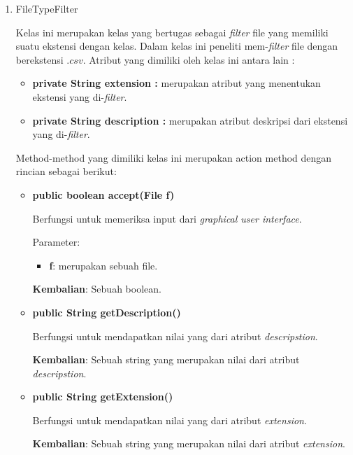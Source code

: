 \begin{enumerate}
	\item FileTypeFilter
	
	Kelas ini merupakan kelas yang bertugas sebagai \textit{filter} file yang memiliki suatu ekstensi dengan kelas. Dalam kelas ini peneliti mem-\textit{filter} file dengan berekstensi \(.csv\). Atribut yang dimiliki oleh kelas ini antara lain :
	
	\begin{itemize}
			\item \textbf{private String extension :} merupakan atribut yang menentukan ekstensi yang di-\textit{filter}.
			\item \textbf{private String description :} merupakan atribut deskripsi dari ekstensi yang di-\textit{filter}.
		\end{itemize}
		
		Method-method yang dimiliki kelas ini merupakan action method dengan rincian sebagai berikut:
		
		\begin{itemize}
		\item \textbf{public boolean accept(File f)} 
		
		Berfungsi untuk memeriksa input dari \textit{graphical user interface}.
		
		Parameter:
	\begin{itemize}
		\item \textbf{f}: merupakan sebuah file. 
	\end{itemize}
	
		\textbf{Kembalian}: Sebuah boolean.
		
		\item \textbf{public String getDescription()}
		
		Berfungsi untuk mendapatkan nilai yang dari atribut \textit{descripstion}.
		
	\textbf{Kembalian}: Sebuah string yang merupakan nilai dari atribut \textit{descripstion}.
		
		\item \textbf{public String getExtension()}
		
		Berfungsi untuk mendapatkan nilai yang dari atribut \textit{extension}.
		
	\textbf{Kembalian}: Sebuah string yang merupakan nilai dari atribut \textit{extension}.
		
	\end{itemize}
\end{enumerate}


